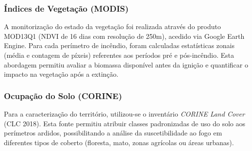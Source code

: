 \subsubsection{Índices de Vegetação (MODIS)}
A monitorização do estado da vegetação foi realizada através do produto MOD13Q1 (NDVI de 16 dias com resolução de 250m), acedido via Google Earth Engine.
Para cada perímetro de incêndio, foram calculadas estatísticas zonais (média e contagem de píxeis) referentes aos períodos pré e pós-incêndio. Esta abordagem permitiu avaliar a biomassa disponível antes da ignição e quantificar o impacto na vegetação após a extinção.

\subsubsection{Ocupação do Solo (CORINE)}
Para a caracterização do território, utilizou-se o inventário \textit{CORINE Land Cover} (CLC 2018). Esta fonte permitiu atribuir classes padronizadas de uso do solo aos perímetros ardidos, possibilitando a análise da suscetibilidade ao fogo em diferentes tipos de coberto (floresta, mato, zonas agrícolas ou áreas urbanas).